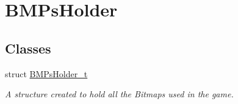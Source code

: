 \hypertarget{group___b_m_ps_holder}{}\section{B\+M\+Ps\+Holder}
\label{group___b_m_ps_holder}
\subsection*{Classes}
\begin{DoxyCompactItemize}
\item 
struct \hyperlink{struct_b_m_ps_holder__t}{B\+M\+Ps\+Holder\+\_\+t}
\begin{DoxyCompactList}\small\item\em A structure created to hold all the Bitmaps used in the game. \end{DoxyCompactList}\end{DoxyCompactItemize}
